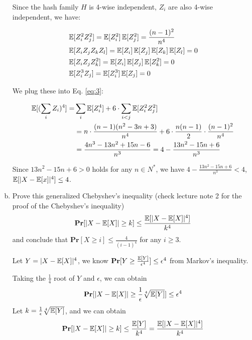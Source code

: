 \begin{problem}[30 points]
\begin{enumerate}[(a)]
Since the hash family $H$ is 4-wise independent, $Z_i$ are also 4-wise independent, we have:

\begin{align}
& \operatorname*{\mathbb{E}}[Z_i^2 Z_j^2] = \operatorname*{\mathbb{E}}[Z_i^2]\operatorname*{\mathbb{E}}[Z_j^2] = \frac{(n-1)^2}{n^4} \notag \\
& \operatorname*{\mathbb{E}}[Z_i Z_j Z_k Z_l] = \operatorname*{\mathbb{E}}[Z_i]\operatorname*{\mathbb{E}}[Z_j]\operatorname*{\mathbb{E}}[Z_k]\operatorname*{\mathbb{E}}[Z_l] = 0 \notag \\
& \operatorname*{\mathbb{E}}[Z_i Z_j Z_k^2] = \operatorname*{\mathbb{E}}[Z_i]\operatorname*{\mathbb{E}}[Z_j]\operatorname*{\mathbb{E}}[Z_k^2] = 0 \notag \\
& \operatorname*{\mathbb{E}}[Z_i^3 Z_j] = \operatorname*{\mathbb{E}}[Z_i^3]\operatorname*{\mathbb{E}}[Z_j] = 0 \notag
\end{align}

We plug these into Eq. \eqref{eq:3}:

\begin{align}
\operatorname*{\mathbb{E}}[(\sum_{i}{Z_i})^4] = & \sum_{i}{\operatorname*{\mathbb{E}}[Z_i^4]} + 6 \cdot \sum_{i<j}{\operatorname*{\mathbb{E}}[Z_i^2 Z_j^2]} \notag \\
& = n \cdot \frac{(n-1)(n^2-3n+3)}{n^4} + 6 \cdot \frac{n(n-1)}{2} \cdot \frac{(n-1)^2}{n^4}  \notag \\
& = \frac{4n^3 - 13n^2 + 15n - 6}{n^3} = 4 - \frac{13n^2 - 15n +6}{n^3}
\end{align}

Since $13n^2 - 15n +6 > 0$ holds for any $n \in N^*$, we have $4 - \frac{13n^2 - 15n +6}{n^3} < 4$, \ie $\operatorname*{\mathbb{E}}[|X - \operatorname*{\mathbb{E}}[x]|^4] \le 4$.

\item Prove this generalized Chebyshev's inequality (check lecture note 2 for the proof of the Chebyshev's inequality)
\begin{gather*}
\mathbf{Pr}[|X - \operatorname*{\mathbb{E}}[X]| \ge k] \le \frac{\operatorname*{\mathbb{E}}[|X - \operatorname*{\mathbb{E}}[X]|^4]}{k^4} \notag \\
\end{gather*}
and conclude that $\mathbf{Pr}[X \ge i] \le \frac{4}{(i - 1)^4}$ for any $i \ge 3$.

\Answer 
Let $Y = |X - \operatorname*{\mathbb{E}}[X]|^4$, we know $\mathbf{Pr}[Y \ge \frac{\operatorname*{\mathbb{E}}[Y]}{\epsilon^4}] \le \epsilon^4$ from Markov's inequality.

Taking the $\frac{1}{4}$ root of $Y$ and $\epsilon$, we can obtain 
\begin{equation}
    \mathbf{Pr}[|X - \operatorname*{\mathbb{E}}[X]| \ge \frac{1}{\epsilon}\sqrt[4]{\operatorname*{\mathbb{E}}[Y]}] \le \epsilon^4
\end{equation}
Let $k=\frac{1}{\epsilon}\sqrt[4]{\operatorname*{\mathbb{E}}[Y]}$, and we can obtain 
\begin{equation}
    \mathbf{Pr}[|X - \operatorname*{\mathbb{E}}[X]| \ge k] \le \frac{\operatorname*{\mathbb{E}}[Y]}{k^4} = \frac{\operatorname*{\mathbb{E}}[|X - \operatorname*{\mathbb{E}}[X]|^4]}{k^4}
\end{equation}


\end{enumerate}
\end{problem}
